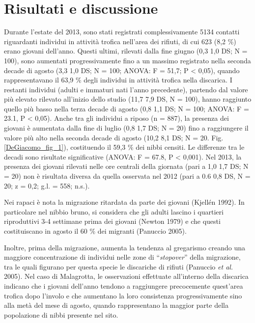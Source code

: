 \section*{Risultati e discussione}

Durante l{\textquoteright}estate del 2013, sono stati registrati
complessivamente 5134 contatti riguardanti individui in attivit\`a
trofica nell{\textquoteright}area dei rifiuti, di cui 623 (8,2 \%)
erano giovani dell{\textquoteright}anno. Questi ultimi, rilevati dalla
fine giugno (0,3 {\textpm} 1,0 DS; N = 100), sono aumentati
progressivamente fino a un massimo registrato nella seconda decade di
agosto (3,3 {\textpm} 1,0 DS; N = 100; ANOVA: F = 51,7; P {\textless}
0,05), quando rappresentavano il 63,9 \% degli individui in attivit\`a
trofica nella discarica. I restanti individui (adulti e immaturi nati
l{\textquoteright}anno precedente), partendo dal valore pi\`u elevato
rilevato all{\textquoteright}inizio dello studio (11,7 {\textpm} 7,9
DS, N = 100), hanno raggiunto quello pi\`u basso nella terza decade di
agosto (0,8 {\textpm} 1,1 DS; N = 100; ANOVA: F = 23.1, P {\textless}
0,05). Anche tra gli individui a riposo (n = 887), la presenza dei
giovani \`e aumentata dalla fine di luglio (0,8 {\textpm} 1,7 DS; N =
20) fino a raggiungere il valore pi\`u alto nella seconda decade di
agosto (10,2 {\textpm} 8,1 DS; N = 20. Fig. \ref{DeGiacomo_fig_1}), costituendo il 59,3 \%
dei nibbi censiti. Le differenze tra le decadi sono risultate
significative (ANOVA: F = 67.8, P {\textless} 0,001). Nel 2013, la
presenza dei giovani rilevati nelle ore centrali della giornata (pari a
1,0 {\textpm} 1,7 DS; N = 20) non \`e risultata diversa da quella
osservata nel 2012 (pari a 0.6 {\textpm} 0,8 DS, N = 20; z = 0,2; g.l.
= 558; n.s.).

Nei rapaci \`e nota la migrazione ritardata da parte dei giovani
(Kjell\'en 1992). In particolare nel nibbio bruno, si considera che gli
adulti lascino i quartieri riproduttivi 3-4 settimane prima dei giovani
(Newton 1979) e che questi costituiscano in agosto il 60 \% dei
migranti (Panuccio 2005).

Inoltre, prima della migrazione, aumenta la tendenza al gregarismo
creando una maggiore concentrazione di individui nelle zone di
{\textquotedblleft}\textit{stopover}{\textquotedblright} della
migrazione, tra le quali figurano per questa specie le discariche di
rifiuti (Panuccio \textit{et al.} 2005). Nel caso di Malagrotta, le
osservazioni effettuate all{\textquoteright}interno della discarica
indicano che i giovani dell{\textquoteright}anno tendono a raggiungere
precocemente quest{\textquoteright}area trofica dopo
l{\textquoteright}involo e che aumentano la loro consistenza
progressivamente sino alla met\`a del mese di agosto, quando
rappresentano la maggior parte della popolazione di nibbi presente nel
sito.

